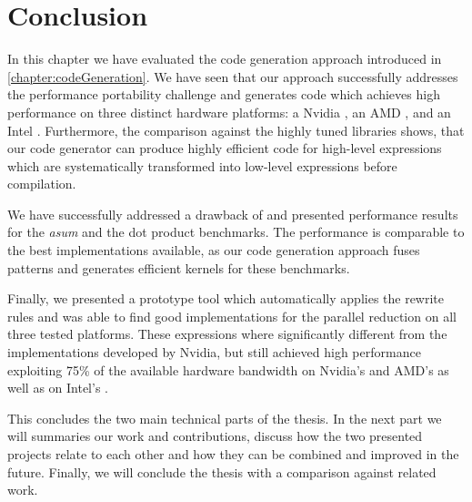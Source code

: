 \section{Conclusion}

In this chapter we have evaluated the code generation approach introduced in \autoref{chapter:codeGeneration}.
We have seen that our approach successfully addresses the performance portability challenge and generates code which achieves high performance on three distinct hardware platforms: a Nvidia \GPU, an AMD \GPU, and an Intel \CPU.
Furthermore, the comparison against the highly tuned \BLAS libraries shows, that our code generator can produce highly efficient code for high-level expressions which are systematically transformed into low-level expressions before compilation.

We have successfully addressed a drawback of \SkelCL and presented performance results for the \emph{asum} and the dot product benchmarks.
The performance is comparable to the best implementations available, as our code generation approach fuses patterns and generates efficient kernels for these benchmarks.

Finally, we presented a prototype tool which automatically applies the rewrite rules and was able to find good implementations for the parallel reduction on all three tested platforms.
These expressions where significantly different from the implementations developed by Nvidia, but still achieved high performance exploiting 75\% of the available hardware bandwidth on Nvidia's and AMD's \GPUs as well as on Intel's \CPU.

\bigskip

This concludes the two main technical parts of the thesis.
In the next part we will summaries our work and contributions, discuss how the two presented projects relate to each other and how they can be combined and improved in the future.
Finally, we will conclude the thesis with a comparison against related work.

